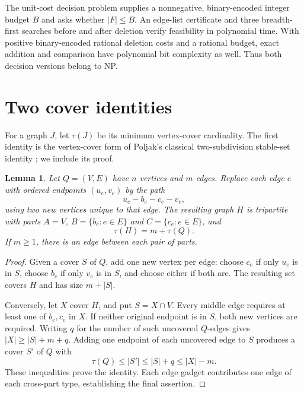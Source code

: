 \documentclass[11pt]{article}
\newtheorem{lemma}[theorem]{Lemma}
\begin{document}
The unit-cost decision problem supplies a nonnegative, binary-encoded integer
budget $B$ and asks whether $|F|\le B$. An edge-list certificate and three
breadth-first searches before and after deletion verify feasibility in polynomial
time. With positive binary-encoded rational deletion costs and a rational budget,
exact addition and comparison have polynomial bit complexity as well. Thus both
decision versions belong to NP.

\section{Two cover identities}
For a graph $J$, let $\tau(J)$ be its minimum vertex-cover cardinality.
The first identity is the vertex-cover form of Poljak's classical
two-subdivision stable-set identity \cite[p.~308]{poljak}; we include its proof.

\begin{lemma}\label{lem:subdivision}
Let $Q=(V,E)$ have $n$ vertices and $m$ edges. Replace each edge $e$ with ordered
endpoints $(u_e,v_e)$ by the path
\[
u_e-b_e-c_e-v_e,
\]
using two new vertices unique to that edge. The resulting graph $H$ is tripartite
with parts $A=V$, $B=\{b_e:e\in E\}$ and $C=\{c_e:e\in E\}$, and
\[
\tau(H)=m+\tau(Q).
\]
If $m\ge1$, there is an edge between each pair of parts.
\end{lemma}
\begin{proof}
Given a cover $S$ of $Q$, add one new vertex per edge: choose $c_e$ if only $u_e$
is in $S$, choose $b_e$ if only $v_e$ is in $S$, and choose either if both are.
The resulting set covers $H$ and has size $m+|S|$.

Conversely, let $X$ cover $H$, and put $S=X\cap V$. Every middle edge requires
at least one of $b_e,c_e$ in $X$. If neither original endpoint is in $S$, both
new vertices are required. Writing $q$ for the number of such uncovered
$Q$-edges gives $|X|\ge |S|+m+q$. Adding one endpoint of each uncovered edge to
$S$ produces a cover $S'$ of $Q$ with
\[
\tau(Q)\le |S'|\le |S|+q\le |X|-m.
\]
These inequalities prove the identity. Each edge gadget contributes one edge
of each cross-part type, establishing the final assertion.
\end{proof}
\end{document}
